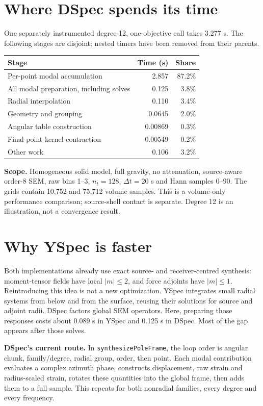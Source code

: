 \documentclass[11pt,a4paper]{article}
\begin{document}
\section{Where DSpec spends its time}
One separately instrumented degree-12, one-objective call takes 3.277 s. The following stages are disjoint; nested timers have been removed from their parents.
\begin{center}
\begin{tabular}{lrr}
\toprule
Stage & Time (s) & Share\\
\midrule
Per-point modal accumulation & 2.857 & 87.2\%\\
All modal preparation, including solves & 0.125 & 3.8\%\\
Radial interpolation & 0.110 & 3.4\%\\
Geometry and grouping & 0.0645 & 2.0\%\\
Angular table construction & 0.00869 & 0.3\%\\
Final point-kernel contraction & 0.00549 & 0.2\%\\
Other work & 0.106 & 3.2\%\\
\bottomrule
\end{tabular}
\end{center}
\textbf{Scope.} Homogeneous solid model, full gravity, no attenuation, source-aware order-8 SEM, raw bins 1--3, $n_t=128$, $\Delta t=20$ s and Hann samples 0--90. The grids contain 10,752 and 75,712 volume samples. This is a volume-only performance comparison; source-shell contact is separate. Degree 12 is an illustration, not a convergence result.
\newpage

\section{Why YSpec is faster}
Both implementations already use exact source- and receiver-centred synthesis: moment-tensor fields have local $|m|\leq2$, and force adjoints have $|m|\leq1$. Reintroducing this idea is not a new optimization. YSpec integrates small radial systems from below and from the surface, reusing their solutions for source and adjoint radii. DSpec factors global SEM operators. Here, preparing those responses costs about 0.089 s in YSpec and 0.125 s in DSpec. Most of the gap appears after those solves.

\textbf{DSpec's current route.} In \texttt{synthesizePoleFrame}, the loop order is angular chunk, family/degree, radial group, order, then point. Each modal contribution evaluates a complex azimuth phase, constructs displacement, raw strain and radius-scaled strain, rotates these quantities into the global frame, then adds them to a full sample. This repeats for both nonradial families, every degree and every frequency.
\end{document}
